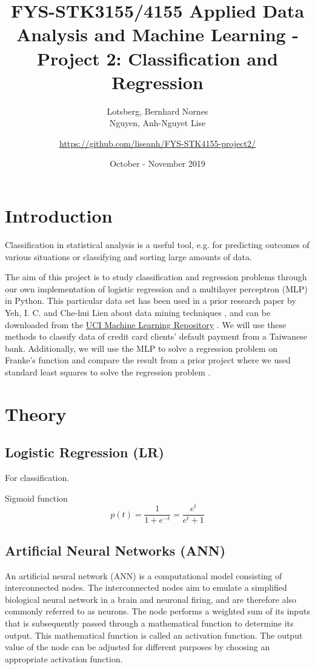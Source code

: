 \documentclass[a4paper, 11pt, twocolumn]{article}
\title{FYS-STK3155/4155 Applied Data Analysis and Machine Learning - Project 2: Classification and Regression }
\author{Lotsberg, Bernhard Nornes \\ Nguyen, Anh-Nguyet Lise \and \url{https://github.com/liseanh/FYS-STK4155-project2/}}
\date{October - November 2019}
\begin{document}

\section{Introduction}
Classification in statistical analysis is a useful tool, e.g. for predicting outcomes of various situations or classifying and sorting large amounts of data. 

The aim of this project is  to study classification and regression problems through our own implementation of logistic regression and a multilayer perceptron (MLP) in Python. This particular data set has been used in a prior research paper by Yeh, I. C. and Che-hui Lien about data mining techniques \cite{origarticle}, and can be downloaded from the \href{https://archive.ics.uci.edu/ml/datasets/default+of+credit+card+clients}{UCI Machine Learning Repository} \cite{UCI}.
We will use these methods to classify data of credit card clients' default payment from a Taiwanese bank. Additionally, we will use the MLP to solve a regression problem on Franke's function and compare the result from a prior project where we used standard least squares to solve the regression problem \cite{regpaper}.  


\section{Theory}

\subsection{Logistic Regression (LR)}
For classification.

Sigmoid function
\begin{equation}
p(t) = \frac{1}{1 + e^{-t}} =\frac{e^t}{e^t+1}
\end{equation}

\subsection{Artificial Neural Networks (ANN)}
An artificial neural network (ANN) is a computational model consisting of interconnected nodes. The interconnected nodes aim to emulate a simplified biological neural network in a brain  and neuronal firing, and are therefore also commonly referred to as neurons.  The node performs a weighted sum of its inputs that is subsequently passed through a mathematical function to determine its output. This mathematical function is called an activation function. The output value of the node can be adjusted for different purposes by choosing an appropriate activation function. 
\end{document}
